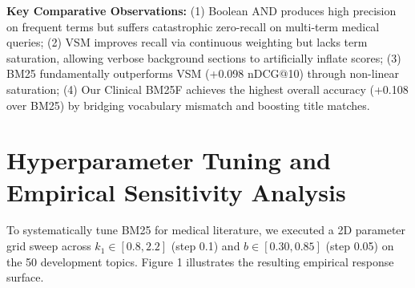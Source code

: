 ﻿\documentclass[9pt,a4paper]{article}
\begin{document}
\begin{table}[H]
\centering
\small
\caption{Empirical Comparison on Full TREC-COVID Collection (171,332 Documents, 50 Dev Queries)}
\vspace{-0.1cm}
\end{table}
\vspace{-0.2cm}

\noindent \textbf{Key Comparative Observations:} (1) Boolean AND produces high precision on frequent terms but suffers catastrophic zero-recall on multi-term medical queries; (2) VSM improves recall via continuous weighting but lacks term saturation, allowing verbose background sections to artificially inflate scores; (3) BM25 fundamentally outperforms VSM (+0.098 nDCG@10) through non-linear saturation; (4) Our Clinical BM25F achieves the highest overall accuracy (+0.108 over BM25) by bridging vocabulary mismatch and boosting title matches.

\clearpage

\section{Hyperparameter Tuning and Empirical Sensitivity Analysis}
To systematically tune BM25 for medical literature, we executed a 2D parameter grid sweep across $k_1 \in [0.8, 2.2]$ (step 0.1) and $b \in [0.30, 0.85]$ (step 0.05) on the 50 development topics. Figure 1 illustrates the resulting empirical response surface.
\end{document}
